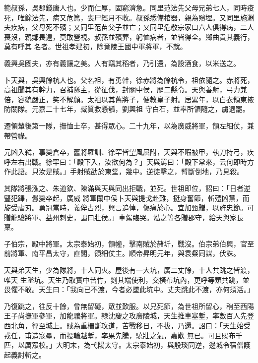 \begin{pinyinscope}
 範叔孫，吳郡錢唐人也。少而仁厚，固窮濟急。同里范法先父母兄弟七人，同時疫死，唯餘法先，病又危篤，喪尸經月不收。叔孫悉備棺器，親為殯埋。又同里施淵夫疾病，父母死不殯；又同里范苗父子並亡；又同里危敬宗家口六人俱得病，二人喪沒，親鄰畏遠，莫敢營視。叔孫並殯葬，躬恤病者，並皆得全。鄉曲貴其義行，莫有呼其
 名者。世祖孝建初，除竟陵王國中軍將軍，不就。



 義興吳國夫，亦有義讓之美。人有竊其稻者，乃引還，為設酒食，以米送之。



 卜天與，吳興餘杭人也。父名祖，有勇幹，徐赤將為餘杭令，祖依隨之。赤將死，高祖聞其有幹力，召補隊主，從征伐，封關中侯，歷二縣令。天與善射，弓力兼倍，容貌嚴正，笑不解顏。太祖以其舊將子，便教皇子射。居累年，以白衣領東掖防關隊。元嘉二十七年，臧質救懸瓠，劉興祖
 守白石，並率所領隨之，虜退罷。



 遷領輦後第一隊，撫恤士卒，甚得眾心。二十九年，以為廣威將軍，領左細仗，兼帶營祿。



 元凶入弒，事變倉卒，舊將羅訓、徐罕皆望風屈附，天與不暇被甲，執刀持弓，疾呼左右出戰。徐罕曰：「殿下入，汝欲何為？」天與罵曰：「殿下常來，云何即時方作此語。只汝是賊。」手射賊劭於東堂，幾中。逆徒擊之，臂斷倒地，乃見殺。



 其隊將張泓之、朱道欽、陳滿與天與同出拒戰，並死。世祖即位，詔曰：「日者逆豎犯蹕，釁變卒起，廣威
 將軍關中侯卜天與提戈赴難，挺身奮節，斬殪凶黨，而旋受虐刃。勇冠當時，義侔古烈，興言追悼，傷痛於心。宜加甄贈，以旌忠節。可贈龍驤將軍、益州刺史，謚曰壯侯。」車駕臨哭。泓之等各贈郡守，給天與家長稟。



 子伯宗，殿中將軍。太宗泰始初，領幢，擊南賊於赭圻，戰沒。伯宗弟伯興，官至前將軍、南平昌太守，直閣，領細仗主。順帝昇明元年，與袁粲同謀，伏誅。



 天與弟天生，少為隊將，十人同火。屋後有一大坑，廣二丈餘，十人共跳之皆渡，唯天
 生墜坑。天生乃取實中苦竹，剡其端使利，交橫布坑內，更呼等類共跳，並畏懼不敢。天生曰：「我向已不渡，今者必墜此坑中。丈夫跳此不渡，亦何須活。」



 乃復跳之，往反十餘，曾無留礙，眾並歎服。以兄死節，為世祖所留心，稍至西陽王子尚撫軍參軍，加龍驤將軍。隸沈慶之攻廣陵城，天生推車塞塹，率數百人先登西北角，徑至城上。賊為重柵斷攻道，苦戰移日，不拔，乃還。詔曰：「天生始受戎任，甫造寇壘，而投輪越塹，率果先騰，驍壯之氣，嘉歎
 無已。可且賜布千匹，以厲眾校。」大明末，為弋陽太守。太宗泰始初，與殷琰同逆，邊城令宿僧護起義討斬之。




\end{pinyinscope}
